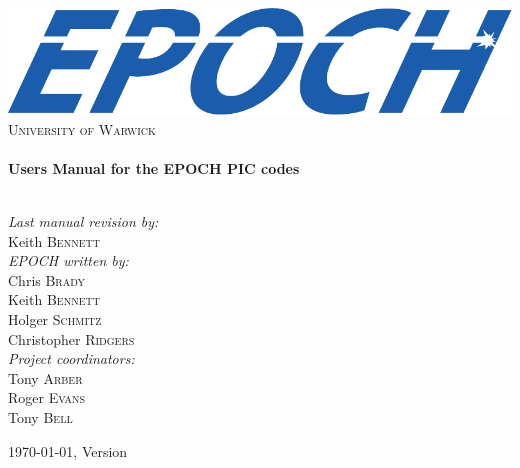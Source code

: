 \begin{titlepage}

\begin{center}

\includegraphics[width=14cm]{./images/EPOCHLogo}\\[1cm]

\textsc{\LARGE{University of Warwick}}\\[1.5cm]

\HRule\\[0.2cm]
{\huge\bfseries{Users Manual for the EPOCH PIC codes}}\\[0.4cm]
\HRule\\[1.5cm]

\begin{minipage}{0.7\textwidth}
\begin{flushleft}\large%
\emph{Last manual revision by:}\\
Keith \textsc{Bennett}\\
\vspace{1cm}
\emph{EPOCH written by:} \\
Chris \textsc{Brady}\\
Keith \textsc{Bennett}\\
Holger \textsc{Schmitz}\\
Christopher \textsc{Ridgers}\\
\vspace{1cm}
\emph{Project coordinators:} \\
Tony \textsc{Arber}\\
Roger \textsc{Evans}\\
Tony \textsc{Bell}\\
\end{flushleft}
\end{minipage}

\vfill%
{\large\today, {\EPOCH} Version \version}

\end{center}

\end{titlepage}
